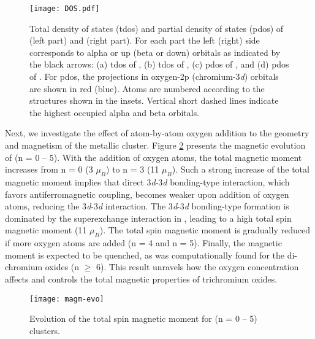 \begin{refsection}
\begin{figure}[htb!]
	\centering
	\texttt{[image: DOS.pdf]}
	\caption{Total density of states (\acrshort{tdos}) and partial density of states (\acrshort{pdos}) of  (left part) and  (right part). For each part the left (right) side corresponds to alpha or up (beta or down) orbitals as indicated by the black arrows: (a) \acrshort{tdos} of , (b) \acrshort{tdos} of , (c) \acrshort{pdos} of , and (d) \acrshort{pdos} of . For \acrshort{pdos}, the projections in oxygen-2p (chromium-3\textit{d}) orbitals are shown in red (blue). Atoms are numbered according to the structures shown in the insets. Vertical short dashed lines indicate the highest occupied alpha and beta orbitals.} 
	\label{fig:dos}
\end{figure}



Next, we investigate the effect of atom-by-atom oxygen addition to the geometry and magnetism of the  metallic cluster. Figure \ref{fig:magevo} presents the magnetic evolution of  (n = 0 -- 5). With the addition of oxygen atoms, the total magnetic moment increases from n = 0 (3 $\mu_B$) to n = 3 (11 $\mu_B$). Such a strong increase of the total magnetic moment implies that direct 3\textit{d}-3\textit{d} bonding-type interaction, which favors antiferromagnetic coupling, becomes weaker upon addition of oxygen atoms, reducing the 3\textit{d}-3\textit{d} interaction. The 3\textit{d}-3\textit{d} bonding-type formation is dominated by the superexchange interaction in , leading to a high total spin magnetic moment (11 $\mu_B$). The total spin magnetic moment is gradually reduced if more oxygen atoms are added (n = 4 and n = 5). Finally, the magnetic moment is expected to be quenched, as was computationally found for the di-chromium oxides  \cite{GutsevCr2On} (n $\geq$ 6). This result unravels how the oxygen concentration affects and controls the total magnetic properties of trichromium oxides.


\begin{figure}[htb!]
	\centering
	\texttt{[image: magm-evo]}
	\caption{Evolution of the total spin magnetic moment for  (n = 0 -- 5) clusters.} 
	\label{fig:magevo}
\end{figure}





\end{refsection}
